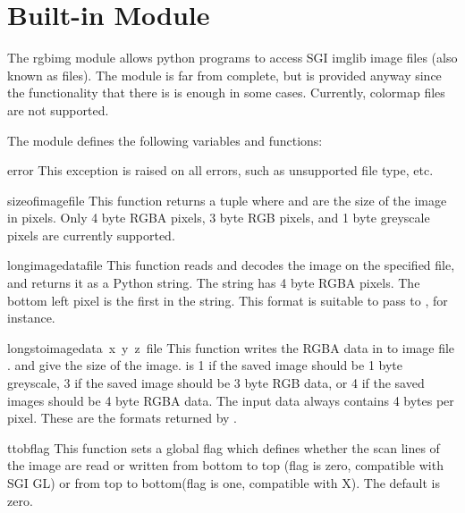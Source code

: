 \section{Built-in Module }
\label{module-rgbimg}

The rgbimg module allows python programs to access SGI imglib image
files (also known as  files).  The module is far from
complete, but is provided anyway since the functionality that there is
is enough in some cases.  Currently, colormap files are not supported.

The module defines the following variables and functions:

\renewcommand{\indexsubitem}{(in module rgbimg)}
\begin{excdesc}{error}
This exception is raised on all errors, such as unsupported file type, etc.
\end{excdesc}

\begin{funcdesc}{sizeofimage}{file}
This function returns a tuple  where
 and  are the size of the image in pixels.
Only 4 byte RGBA pixels, 3 byte RGB pixels, and 1 byte greyscale pixels
are currently supported.
\end{funcdesc}

\begin{funcdesc}{longimagedata}{file}
This function reads and decodes the image on the specified file, and
returns it as a Python string. The string has 4 byte RGBA pixels.
The bottom left pixel is the first in
the string. This format is suitable to pass to ,
for instance.
\end{funcdesc}

\begin{funcdesc}{longstoimage}{data\, x\, y\, z\, file}
This function writes the RGBA data in  to image
file .  and  give the size of the image.
 is 1 if the saved image should be 1 byte greyscale, 3 if the
saved image should be 3 byte RGB data, or 4 if the saved images should
be 4 byte RGBA data.  The input data always contains 4 bytes per pixel.
These are the formats returned by .
\end{funcdesc}

\begin{funcdesc}{ttob}{flag}
This function sets a global flag which defines whether the scan lines
of the image are read or written from bottom to top (flag is zero,
compatible with SGI GL) or from top to bottom(flag is one,
compatible with X)\@.  The default is zero.
\end{funcdesc}
